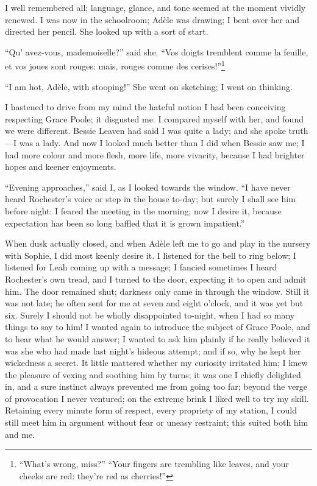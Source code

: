 I well remembered all; language, glance, and tone seemed at the moment
vividly renewed.  I was now in the schoolroom; Adèle was drawing; I bent
over her and directed her pencil.  She looked up with a sort of start.

\foreignquote{french}{Qu' avez-vous, mademoiselle?} said she.  \foreignquote{french}{Vos doigts
	tremblent comme la feuille, et vos joues sont rouges: mais, rouges comme
	des cerises!}\footnote{\enquote{What's wrong, miss?} \textelp{} \enquote{Your
		fingers are trembling like leaves, and your cheeks are red: they're red as cherries!}}

\enquote{I am hot, Adèle, with stooping!}  She went on sketching; I went
on thinking.

I hastened to drive from my mind the hateful notion I had been
conceiving respecting Grace Poole; it disgusted me.  I compared myself
with her, and found we were different.  Bessie Leaven had said I was
quite a lady; and she spoke truth---I was a lady.  And now I looked much
better than I did when Bessie saw me; I had more colour and more flesh,
more life, more vivacity, because I had brighter hopes and keener
enjoyments.

\enquote{Evening approaches,} said I, as I looked towards the window.
\enquote{I have never heard \Mr{} Rochester's voice or step in the house
	to-day; but surely I shall see him before night: I feared the meeting in
	the morning; now I desire it, because expectation has been so long
	baffled that it is grown impatient.}

When dusk actually closed, and when Adèle left me to go and play in the
nursery with Sophie, I did most keenly desire it.  I listened for the
bell to ring below; I listened for Leah coming up with a message; I
fancied sometimes I heard \Mr{} Rochester's own tread, and I turned to the
door, expecting it to open and admit him.  The door remained shut;
darkness only came in through the window.  Still it was not late; he
often sent for me at seven and eight o'clock, and it was yet but six.
Surely I should not be wholly disappointed to-night, when I had so many
things to say to him!  I wanted again to introduce the subject of Grace
Poole, and to hear what he would answer; I wanted to ask him plainly if
he really believed it was she who had made last night's hideous attempt;
and if so, why he kept her wickedness a secret.  It little mattered
whether my curiosity irritated him; I knew the pleasure of vexing and
soothing him by turns; it was one I chiefly delighted in, and a sure
instinct always prevented me from going too far; beyond the verge of
provocation I never ventured; on the extreme brink I liked well to try
my skill.  Retaining every minute form of respect, every propriety of my
station, I could still meet him in argument without fear or uneasy
restraint; this suited both him and me.

